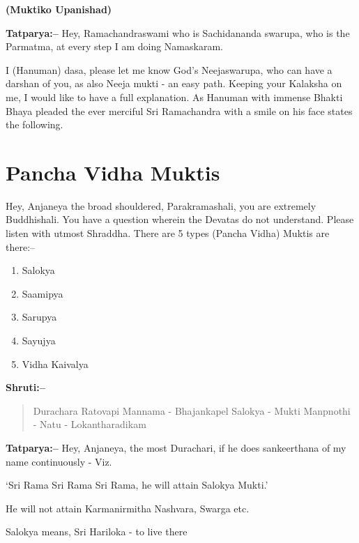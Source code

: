 \begin{flushright}
\textbf{(Muktiko Upanishad)}
\end{flushright}

\textbf{Tatparya:–} Hey, Ramachandraswami who is Sachidananda swarupa, who is the Parmatma, at every step I am doing Namaskaram.

I (Hanuman) dasa, please let me know God's Neejaswarupa, who can have a darshan of you, as also Neeja mukti - an easy path. Keeping your Kalaksha on me, I would like to have a full explanation. As Hanuman with immense Bhakti Bhaya pleaded the ever merciful Sri Ramachandra with a smile on his face states the following.

\chapter{Pancha Vidha Muktis}

Hey, Anjaneya the broad shouldered, Parakramashali, you are extremely Buddhishali. You have a question wherein the Devatas do not understand. Please listen with utmost Shraddha. There are 5 types (Pancha Vidha) Muktis are there:–

\begin{enumerate}
\item Salokya

 \item Saamipya

 \item Sarupya

 \item Sayujya

 \item Vidha Kaivalya

\end{enumerate}

\textbf{Shruti:–}

\begin{verse}
Durachara Ratovapi Mannama - Bhajankapel Salokya - Mukti Manpnothi - Natu - Lokantharadikam 
\end{verse}

\textbf{Tatparya:–} Hey, Anjaneya, the most Durachari, if he does sankeerthana of my name continuously - Viz.

‘Sri Rama Sri Rama Sri Rama, he will attain Salokya Mukti.’

He will not attain Karmanirmitha Nashvara, Swarga etc.

Salokya means, Sri Hariloka - to live there

